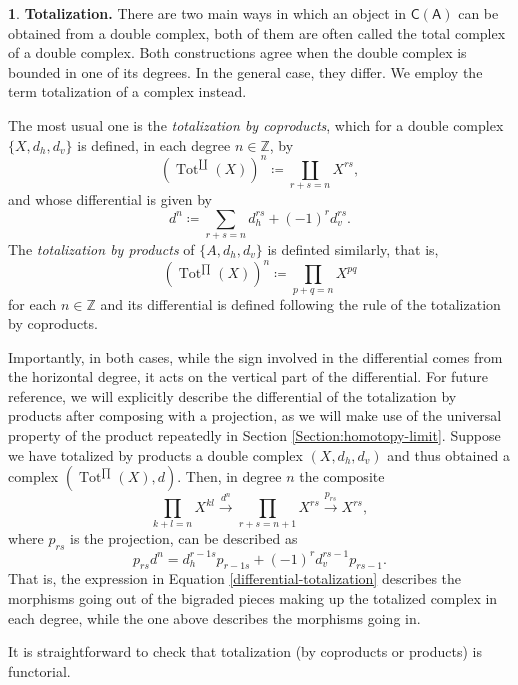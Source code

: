\documentclass[reqno,11pt]{amsart}
\theoremstyle{plain}
\theoremstyle{remark}
\theoremstyle{definition}
\newtheorem{cosa}[thm]{}
\numberwithin{equation}{thm}
\newcommand{\SA}{\mathsf{A}}
\newcommand{\CCC}{\boldsymbol{\mathsf{C}}}
\newcommand{\ZZ}{\mathbb{Z}}
\DeclareMathOperator{\Tot}{Tot}
\begin{document}
\begin{cosa}\label{totalization}
		\textbf{Totalization.}
		There are two main ways in which an object in $\CCC(\SA)$ can be obtained from a double complex, both of them are often called the total complex of a double complex. Both constructions agree when the double complex is bounded in one of its degrees. In the general case, they differ. We employ the term totalization of a complex instead.
		
		The most usual one is the \textit{totalization by coproducts}, which for a double complex $\{X, d_h, d_v\}$ is defined, in each degree $n \in \ZZ$, by 
		\[ \left(\Tot^{\coprod}(X)\right)^n \coloneqq \coprod_{r+s=n} X^{rs}, \]
		and whose differential is given by 
		\begin{equation}\label{differential-totalization}
			d^n \coloneqq \sum_{r+s = n} d_h^{rs} + (-1)^r d_v^{rs}.
		\end{equation}
		The \textit{totalization by products} of $\{A, d_h, d_v\}$ is definted similarly, that is, 
		\[
			\left(\Tot^{\prod}(X)\right)^n \coloneqq \prod_{p+q=n} X^{pq}
		\] for each $n \in \ZZ$ and its differential is defined following the rule of the totalization by coproducts.
		
		Importantly, in both cases, while the sign involved in the differential comes from the horizontal degree, it acts on the vertical part of the differential. For future reference, we will explicitly describe the differential of the totalization by products after composing with a projection, as we will make use of the universal property of the product repeatedly in Section \ref{Section:homotopy-limit}. Suppose we have totalized by products a double complex $(X, d_h, d_v)$ and thus obtained a complex $(\Tot^{\prod}(X), d)$. Then, in degree $n$ the composite 
		\[
			\prod_{k+l=n} X^{kl} \xrightarrow{d^n} \prod_{r+s=n+1} X^{rs} \xrightarrow{p_{rs}} X^{rs},
		\]
		where $p_{rs}$ is the projection, can be described as
		\begin{equation}\label{differential-totalization-products}
			p_{rs} d^n = d_h^{r-1 s} p_{r-1 s} + (-1)^r d_v^{r s-1} p_{r s-1}.
		\end{equation}
		That is, the expression in Equation \ref{differential-totalization} describes the morphisms going out of the bigraded pieces making up the totalized complex in each degree, while the one above describes the morphisms going in.
		
		It is straightforward to check that totalization (by coproducts or products) is functorial.
	\end{cosa}
\end{document}
